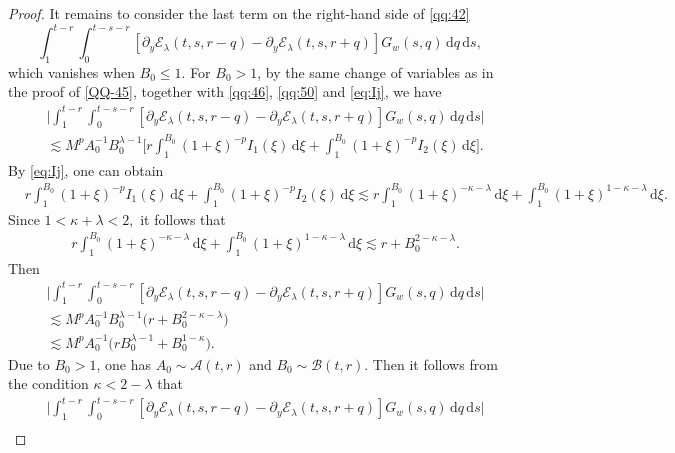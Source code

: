 \documentclass[11pt,twoside]{article}
\newcommand{\Acal}{\mathcal A}
\newcommand{\Bcal}{\mathcal B}
\newcommand{\dd}{\,\mathrm{d}}
\newcommand{\Ecal}{\mathcal E}
\theoremstyle{plain}
\theoremstyle{definition}
\theoremstyle{remark}
\numberwithin{equation}{section}
\begin{document}
\begin{proof}
It remains to consider the last term on the right-hand side of
\eqref{qq:42}
\[
\int_1^{t-r}
\int_0^{t-s-r}
\left[
\partial_y\Ecal_\lambda(t,s,r-q)
-
\partial_y\Ecal_\lambda(t,s,r+q)
\right]
G_w(s,q)\dd q\dd s,
\]
which vanishes when $B_0\leq1$. For $B_0>1$, by the same
change of variables as in the proof of \eqref{QQ-45}, together
with \eqref{qq:46}, \eqref{qq:50} and \eqref{eq:Ij}, we have
\begin{equation}
\label{qq:64'}
\begin{aligned}
&
\big|
\int_1^{t-r}
\int_0^{t-s-r}
\left[
\partial_y\Ecal_\lambda(t,s,r-q)
-
\partial_y\Ecal_\lambda(t,s,r+q)
\right]
G_w(s,q)\dd q\dd s
\big|\\
&\lesssim
M^p
A_0^{-1}B_0^{\lambda-1}
\big[
r
\int_1^{B_0}
(1+\xi)^{-p}
I_1(\xi)\dd\xi
+
\int_1^{B_0}
(1+\xi)^{-p}
I_2(\xi)\dd\xi
\big].
\end{aligned}
\end{equation}
By \eqref{eq:Ij}, one can obtain
\[
\begin{aligned}
&
r
\int_1^{B_0}
(1+\xi)^{-p}
I_1(\xi)\dd\xi
+
\int_1^{B_0}
(1+\xi)^{-p}
I_2(\xi)\dd\xi\lesssim
r
\int_1^{B_0}
(1+\xi)^{-\kappa-\lambda}
\dd\xi
+
\int_1^{B_0}
(1+\xi)^{1-\kappa-\lambda}
\dd\xi .
\end{aligned}
\]
Since
$
1<\kappa+\lambda<2,
$
it follows that
\[
\begin{aligned}
&
r
\int_1^{B_0}
(1+\xi)^{-\kappa-\lambda}
\dd\xi
+
\int_1^{B_0}
(1+\xi)^{1-\kappa-\lambda}
\dd\xi\lesssim
r+B_0^{2-\kappa-\lambda}.
\end{aligned}
\]
Then
\begin{equation}
\label{qq:65}
\begin{aligned}
&
\big|
\int_1^{t-r}
\int_0^{t-s-r}
\left[
\partial_y\Ecal_\lambda(t,s,r-q)
-
\partial_y\Ecal_\lambda(t,s,r+q)
\right]
G_w(s,q)\dd q\dd s
\big|\\
&\lesssim
M^pA_0^{-1}B_0^{\lambda-1}
\big(
r+B_0^{2-\kappa-\lambda}
\big)\\
&\lesssim
M^pA_0^{-1}
\big(
rB_0^{\lambda-1}
+B_0^{1-\kappa}
\big).
\end{aligned}
\end{equation}
Due to $B_0>1$, one has
$A_0\sim\Acal(t,r)$ and $B_0\sim\Bcal(t,r)$.
Then it follows from the condition $\kappa<2-\lambda$  that
\begin{equation}
\label{qq:66}
\begin{aligned}
&
\big|
\int_1^{t-r}
\int_0^{t-s-r}
\left[
\partial_y\Ecal_\lambda(t,s,r-q)
-\partial_y\Ecal_\lambda(t,s,r+q)
\right]
G_w(s,q)\dd q\dd s
\big|\\

\end{aligned}
\end{equation}
\end{proof}
\end{document}
